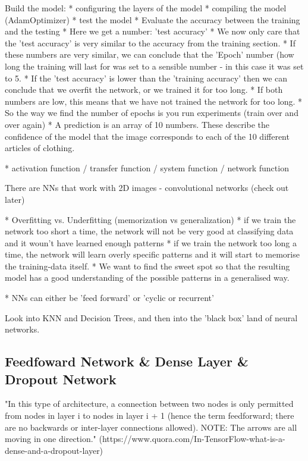 \documentclass[
a4paper,
11pt,
english
]{report}
\begin{document}
Build the model:
	* configuring the layers of the model
	* compiling the model (AdamOptimizer)
	* test the model
		* Evaluate the accuracy between the training and the testing
          * Here we get a number: 'test accuracy'
          * We now only care that the 'test accuracy' is very similar to the accuracy from the training section.
              * If these numbers are very similar, we can conclude that the 'Epoch' number (how long the training will last for was set to a sensible number - in this case it was set to 5.
              * If the 'test accuracy' is lower than the 'training accuracy' then we can conclude that we overfit the network, or we trained it for too long.
              * If both numbers are low, this means that we have not trained the network for too long.
          * So the way we find the number of epochs is you run experiments (train over and over again)
          * A prediction is an array of 10 numbers. These describe the confidence of the model that the image corresponds to each of the 10 different articles of clothing.

* activation function / transfer function / system function / network function

There are NNs that work with 2D images - convolutional networks (check out later)

* Overfitting vs. Underfitting (memorization vs generalization)
    * if we train the network too short a time, the network will not be very good at classifying data and it woun't have learned enough patterns
    * if we train the network too long a time, the network will learn overly specific patterns and it will start to memorise the training-data itself.
    * We want to find the sweet spot so that the resulting model has a good understanding of the possible patterns in a generalised way.

* NNs can either be 'feed forward' or 'cyclic or recurrent'

Look into KNN and Decision Trees, and then into the 'black box' land of neural networks.


\subsection{Feedfoward Network & Dense Layer & Dropout Network}
"In this type of architecture, a connection between two nodes is only permitted from nodes in layer i to nodes in layer i + 1 (hence the term feedforward; there are no backwards or inter-layer connections allowed). NOTE: The arrows are all moving in one direction." (https://www.quora.com/In-TensorFlow-what-is-a-dense-and-a-dropout-layer)
\end{document}
